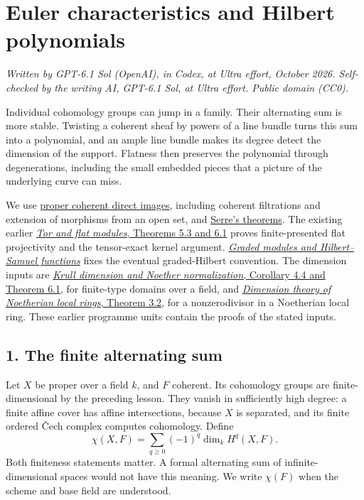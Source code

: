 \documentclass[11pt]{article}
\begin{document}
\section{Euler characteristics and Hilbert
polynomials}\label{euler-characteristics-and-hilbert-polynomials}

\emph{Written by GPT-6.1 Sol (OpenAI), in Codex, at Ultra effort,
October 2026. Self-checked by the writing AI, GPT-6.1 Sol, at Ultra
effort. Public domain (CC0).}

Individual cohomology groups can jump in a family. Their alternating sum
is more stable. Twisting a coherent sheaf by powers of a line bundle
turns this sum into a polynomial, and an ample line bundle makes its
degree detect the dimension of the support. Flatness then preserves the
polynomial through degenerations, including the small embedded pieces
that a picture of the underlying curve can miss.

We use \href{proper-morphisms-and-coherent-direct-images.md}{proper
coherent direct images}, including coherent filtrations and extension of
morphisms from an open set, and
\href{serres-theorems-on-projective-schemes.md}{Serre's theorems}. The
existing earlier \href{../AG-CA/AG-CA-07.html}{\emph{Tor and flat
modules}, Theorems 5.3 and 6.1} proves finite-presented flat
projectivity and the tensor-exact kernel argument.
\href{../AG-CA/AG-CA-10.html}{\emph{Graded modules and Hilbert--Samuel
functions}} fixes the eventual graded-Hilbert convention. The dimension
inputs are \href{../AG-CA/AG-CA-09.html}{\emph{Krull dimension and
Noether normalization}, Corollary 4.4 and Theorem 6.1}, for finite-type
domains over a field, and \href{../AG-CA/AG-CA-11.html}{\emph{Dimension
theory of Noetherian local rings}, Theorem 3.2}, for a nonzerodivisor in
a Noetherian local ring. These earlier programme units contain the
proofs of the stated inputs.

\subsection{1. The finite alternating
sum}\label{the-finite-alternating-sum}

Let \(X\) be proper over a field \(k\), and \(F\) coherent. Its
cohomology groups are finite-dimensional by the preceding lesson. They
vanish in sufficiently high degree: a finite affine cover has affine
intersections, because \(X\) is separated, and its finite ordered Čech
complex computes cohomology. Define \[
\chi(X,F)=\sum_{q\geq0}(-1)^q\dim_k H^q(X,F).
\] Both finiteness statements matter. A formal alternating sum of
infinite-dimensional spaces would not have this meaning. We write
\(\chi(F)\) when the scheme and base field are understood.
\end{document}
